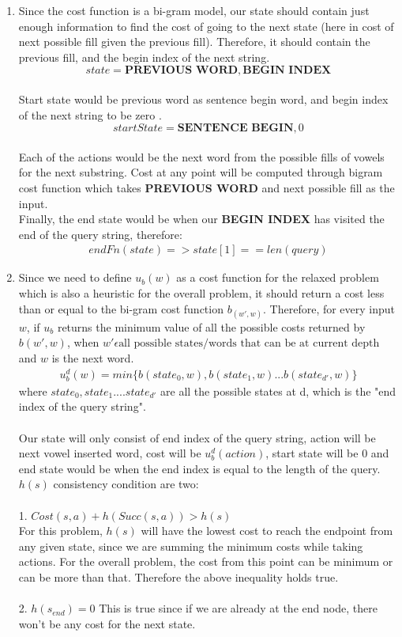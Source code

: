 \documentclass[12pt]{article}
\begin{document}
\begin{enumerate}[label=(\alph*)]
	\item Since the cost function is a bi-gram model, our state should contain just enough information to find the cost of going to the next state (here in cost of next possible fill given the previous fill). Therefore, it should contain the previous fill, and the begin index of the next string. $$state = \textbf{PREVIOUS WORD}, \textbf{BEGIN INDEX} $$ \\
	Start state would be previous word as sentence begin word, and begin index of the next string to be zero . $$ startState = \textbf{SENTENCE BEGIN}, 0 $$ \\
	Each of the actions would be the next word from the possible fills of vowels for the next substring. Cost at any point will be computed through bigram cost function which takes \textbf{PREVIOUS WORD} and next possible fill as the input. \\
	Finally, the end state would be when our \textbf{BEGIN INDEX} has visited the end of the query string, therefore:
	\begin{align*}
	endFn(state) => state[1] == len(query)
	\end{align*}
	\addtocounter{enumi}{1}
	\item Since we need to define $u_b(w)$ as a cost function for the relaxed problem which is also a heuristic for the overall problem, it should return a cost less than or equal to the bi-gram cost function $b_(w', w)$. Therefore, for every input $w$, if $u_b$ returns the minimum value of all the possible costs returned by $b(w', w)$, when $w' \epsilon \text{all possible states/words that can be at current depth}$ and $w$ is the next word.
	\begin{align*}
	u_{b}^d(w) = min \{b(state_0, w), b(state_1, w) ... b(state_{d'}, w)\}
	\end{align*}
	where $state_0, state_1 .... state_{d'}$ are all the possible states at d, which is the "end index of the query string". \\ \\
	Our state will only consist of end index of the query string, action will be next vowel inserted word, cost will be $u_{b}^d(action)$, start state will be 0 and end state would be when the end index is equal to the length of the query. \\
	$h(s)$ consistency condition are two: \\ \\
	1. $Cost(s,a) + h(Succ(s,a)) > h(s)$ \\
	For this problem, $h(s)$ will have the lowest cost to reach the endpoint from any given state, since we are summing the minimum costs while taking actions. For the overall problem, the cost from this point can be minimum or can be more than that. Therefore the above inequality holds true. \\ \\
	2. $h(s_{end}) = 0$
	This is true since if we are already at the end node, there won't be any cost for the next state.
	

\end{enumerate}
\end{document}
